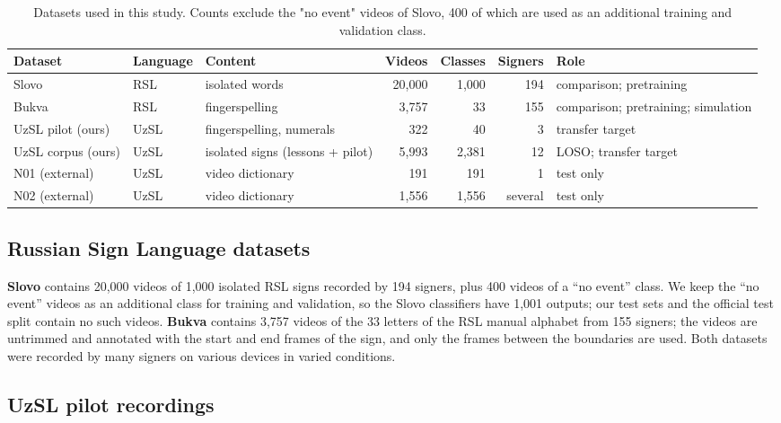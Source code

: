 \documentclass[a4paper,fleqn]{cas-dc}
\begin{document}
\begin{table}[t]
\caption{Datasets used in this study. Counts exclude the "no event" videos of Slovo, 400 of which are used as an additional training and validation class.}\label{tab:datasets}
\footnotesize\setlength{\tabcolsep}{4pt}
\centering
\begin{tabular}{lllrrrl}
\toprule
\textbf{Dataset} & \textbf{Language} & \textbf{Content} & \textbf{Videos} & \textbf{Classes} & \textbf{Signers} & \textbf{Role} \\
\midrule
Slovo & RSL & isolated words & 20,000 & 1,000 & 194 & comparison; pretraining \\
Bukva & RSL & fingerspelling & 3,757 & 33 & 155 & comparison; pretraining; simulation \\
UzSL pilot (ours) & UzSL & fingerspelling, numerals & 322 & 40 & 3 & transfer target \\
UzSL corpus (ours) & UzSL & isolated signs (lessons + pilot) & 5,993 & 2,381 & 12 & LOSO; transfer target \\
N01 (external) & UzSL & video dictionary & 191 & 191 & 1 & test only \\
N02 (external) & UzSL & video dictionary & 1,556 & 1,556 & several & test only \\
\bottomrule
\end{tabular}
\end{table}

\hypertarget{russian-sign-language-datasets}{%
\subsection{Russian Sign Language datasets}\label{russian-sign-language-datasets}}

\textbf{Slovo} \cite{2023_kapitanov_slovo} contains 20,000 videos of 1,000 isolated RSL signs recorded by 194 signers, plus 400 videos of a ``no event'' class. We keep the ``no event'' videos as an additional class for training and validation, so the Slovo classifiers have 1,001 outputs; our test sets and the official test split contain no such videos. \textbf{Bukva} \cite{2024_kvanchiani_bukva} contains 3,757 videos of the 33 letters of the RSL manual alphabet from 155 signers; the videos are untrimmed and annotated with the start and end frames of the sign, and only the frames between the boundaries are used. Both datasets were recorded by many signers on various devices in varied conditions.

\hypertarget{uzsl-pilot-recordings}{%
\subsection{UzSL pilot recordings}\label{uzsl-pilot-recordings}}
\end{document}
